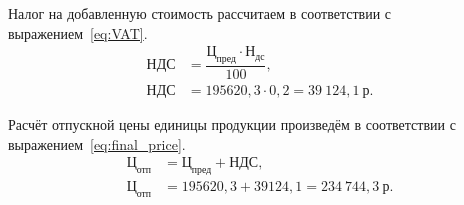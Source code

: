Налог на добавленную стоимость рассчитаем в соответствии с
выражением~\ref{eq:VAT}.
\begin{align}
  \label{eq:VAT}
  \text{НДС} &= \dfrac{\text{Ц}_{\text{пред}} \cdot \text{Н}_{\text{дс}}}{100}, \\
  \text{НДС} &= 195620{,}3 \cdot 0{,}2 = 39~124{,}1 \: \text{р.} \nonumber
\end{align}

Расчёт отпускной цены единицы продукции произведём в соответствии с
выражением~\ref{eq:final_price}.
\begin{align}
  \label{eq:final_price}
  \text{Ц}_{\text{отп}} &= \text{Ц}_{\text{пред}} + \text{НДС}, \\
  \text{Ц}_{\text{отп}} &= 195620{,}3 + 39124{,}1 =
    234~744{,}3 \: \text{р.} \nonumber
\end{align}
